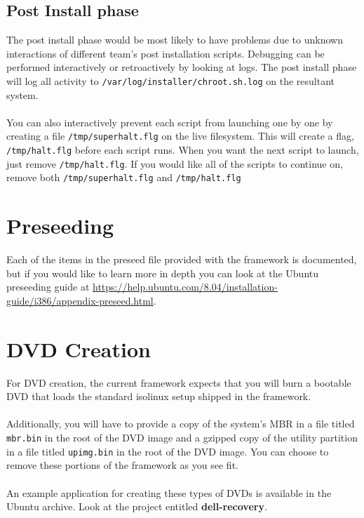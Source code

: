\documentclass[letterpaper,10pt,titlepage]{article}
\begin{document}
\subsection{Post Install phase}
The post install phase would be most likely to have problems due to unknown interactions of different team's post installation scripts.
Debugging can be performed interactively or retroactively by looking at logs.  The post install phase will log all activity to \texttt{/var/log/installer/chroot.sh.log} on the resultant system.
\\
\\
You can also interactively prevent each script from launching one by one by creating a file \texttt{/tmp/superhalt.flg} on the live filesystem.  This will create a flag, \texttt{/tmp/halt.flg} before each script runs.  When you want the next script to launch, just remove \texttt{/tmp/halt.flg}.  If you would like all of the scripts to continue on, remove both \texttt{/tmp/superhalt.flg} and \texttt{/tmp/halt.flg}

\section{Preseeding}
Each of the items in the preseed file provided with the framework is documented, but if you would like to learn more in depth you can  look at the Ubuntu preseeding guide at \url{https://help.ubuntu.com/8.04/installation-guide/i386/appendix-preseed.html}.

\section{DVD Creation}
For DVD creation, the current framework expects that you will burn a bootable DVD that loads the standard isolinux setup shipped in the framework.
\\
\\
Additionally, you will have to provide a copy of  the system's MBR in a file titled \texttt{mbr.bin} in the root of the DVD image and a gzipped copy of the utility partition in a file titled \texttt{upimg.bin} in the root of the DVD image.  You can choose to remove these portions of the framework as you see fit.
\\
\\
An example application for creating these types of DVDs is available in the Ubuntu archive.  Look at the project entitled \textbf{dell-recovery}.


\end{document}
